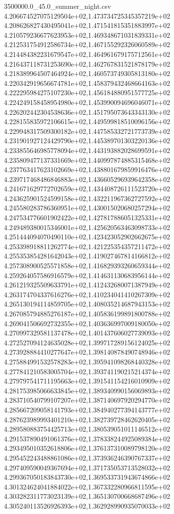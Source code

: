 \begin{filecontents*}{3500000.0_45.0_summer_night.csv}
4.206674527075129504e+02,1.473734725345357219e+02
4.208626827430495041e+02,1.471541815351883997e+02
4.210579236677623953e+02,1.469348671031839331e+02
4.212531754912586734e+02,1.467155292326060589e+02
4.214484382231679547e+02,1.464961679175712561e+02
4.216437118731253690e+02,1.462767831521878179e+02
4.218389964507464924e+02,1.460573749305813180e+02
4.220342919656674781e+02,1.458379432468664163e+02
4.222295984275107230e+02,1.456184880951577725e+02
4.224249158458954980e+02,1.453990094696046071e+02
4.226202442304538636e+02,1.451795073643343130e+02
4.228155835972106615e+02,1.449599818510096156e+02
4.229948317509300182e+02,1.447585332721773739e+02
4.231901927124429790e+02,1.445389701303220136e+02
4.233855646985778094e+02,1.443193882028699591e+02
4.235809477137331669e+02,1.440997874885315468e+02
4.237763417623102669e+02,1.438801679859916476e+02
4.239717468486846883e+02,1.436605296939642358e+02
4.241671629772702659e+02,1.434408726111523720e+02
4.243625901524599158e+02,1.432211967362727592e+02
4.245580283786360951e+02,1.430015020680257294e+02
4.247534776601902422e+02,1.427817886051325331e+02
4.249489380015346001e+02,1.425620563463098733e+02
4.251444094070490110e+02,1.423423052902662675e+02
4.253398918811262774e+02,1.421225354357211472e+02
4.255353854281642043e+02,1.419027467814166812e+02
4.257308900525571858e+02,1.416829393260659344e+02
4.259264057586916579e+02,1.414631130683956144e+02
4.261219325509633791e+02,1.412432680071387949e+02
4.263174704337616276e+02,1.410234041410267309e+02
4.265130194114859705e+02,1.408035214687943153e+02
4.267085794885276187e+02,1.405836199891800788e+02
4.269041506692732355e+02,1.403636997009180050e+02
4.270997329581137478e+02,1.401437606027739093e+02
4.272527094124635028e+02,1.399717289156124025e+02
4.273928884410277647e+02,1.398140878490748946e+02
4.275884991532578283e+02,1.395941098268440328e+02
4.277841210583005704e+02,1.393741190215214374e+02
4.279797541711195663e+02,1.391541154216010909e+02
4.281753985066633845e+02,1.389340990156069893e+02
4.283710540799107207e+02,1.387140697920294770e+02
4.285667209058141793e+02,1.384940277394143777e+02
4.287623989993401210e+02,1.382739728462620405e+02
4.289580883754425713e+02,1.380539051011146512e+02
4.291537890491061376e+02,1.378338244925089384e+02
4.293495010352618806e+02,1.376137310089798120e+02
4.295452243488861086e+02,1.373936246390767337e+02
4.297409590049367694e+02,1.371735053713528032e+02
4.299367050183843730e+02,1.369533731943674866e+02
4.301324624041884022e+02,1.367332280966811595e+02
4.303282311773023139e+02,1.365130700668687496e+02
4.305240113526926393e+02,1.362928990935070033e+02

\end{filecontents*}
